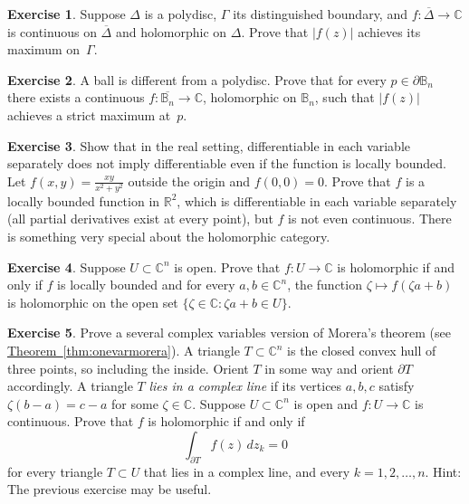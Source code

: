 \documentclass[12pt,openany]{book}
\newcommand{\sabs}[1]{\lvert {#1} \rvert}
\newcommand{\C}{{\mathbb{C}}}
\newcommand{\R}{{\mathbb{R}}}
\newcommand{\bB}{{\mathbb{B}}}
\theoremstyle{plain}
\theoremstyle{remark}
\theoremstyle{definition}
\newenvironment{exbox}{%
    \def\FrameCommand{\vrule width 1pt \relax\hspace{10pt}}%
    \MakeFramed{\advance\hsize-\width\FrameRestore}%
}{%
    \endMakeFramed
}
\theoremstyle{exercise}
\newtheorem{exercise}{Exercise}[section]
\theoremstyle{example}
\newcommand{\thmref}[1]{\hyperref[#1]{Theorem~\ref*{#1}}}
\begin{document}
\begin{exbox}
\begin{exercise}
Suppose $\Delta$ is a polydisc, $\Gamma$ its distinguished boundary,
and $f \colon \overline{\Delta} \to \C$ is continuous on $\overline{\Delta}$
and holomorphic on $\Delta$.
Prove that
$\sabs{f(z)}$ achieves its maximum on~$\Gamma$.
\end{exercise}

\begin{exercise}
A ball is different from a polydisc.  Prove that for every $p \in \partial \bB_n$
there exists a continuous $f \colon \overline{\bB_n} \to \C$, holomorphic
on $\bB_n$, such that $\sabs{f(z)}$ achieves a strict maximum at~$p$.
\end{exercise}

\begin{exercise}
Show that in the real setting, differentiable
in each variable separately does not imply differentiable even if
the function is locally bounded.
Let $f(x,y) = \frac{xy}{x^2+y^2}$ outside the origin
and $f(0,0) = 0$.  Prove that $f$ is a
locally bounded function in $\R^2$, which is differentiable
in each variable separately (all partial derivatives exist at every point),
but $f$ is not even continuous.  There is something very
special about the holomorphic category.
\end{exercise}

\begin{exercise}
Suppose $U \subset \C^n$ is open.
Prove that $f \colon U \to \C$ is holomorphic if and only if
$f$ is locally bounded and
for every $a,b \in \C^n$, the
function
$\zeta \mapsto f(\zeta a + b)$ is holomorphic on
the open set $\{ \zeta \in \C : \zeta a + b \in U \}$.
\end{exercise}

\begin{exercise}
Prove a several complex variables version of Morera's theorem (see
\thmref{thm:onevarmorera}).
A triangle $T \subset \C^n$ is the closed convex hull of three points, so
including the inside.  Orient $T$ in some way %
and orient $\partial T$ accordingly.
A triangle $T$ \emph{lies in a complex line} if
its vertices $a,b,c$ satisfy
$\zeta (b-a) = c-a$ for some $\zeta \in \C$.
Suppose $U \subset \C^n$ is open and $f \colon U \to \C$ is continuous.
Prove that $f$ is holomorphic if and only if
\begin{equation*}
\int_{\partial T} f(z) \, dz_k = 0
\end{equation*}
for every triangle $T \subset U$ that lies in a complex line,
and every $k=1,2,\ldots,n$.
Hint: The previous exercise may be useful.
\end{exercise}


\end{exbox}
\end{document}
